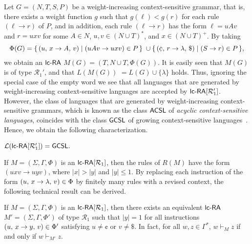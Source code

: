 Let $G=(N,T,S,P)$ be a weight-increasing context-sensitive grammar, that is, there exists a weight function $g$ such that $g(\ell) < g(r)$ for each rule $(\ell\to r)$ of $P$, and in addition, each rule $(\ell\to r)$ has the form $\ell=uAv$ and $r=uxv$ for some $A\in N$, $u,v\in(N\cup T)^*$, and $x\in (N\cup T)^+$. By taking
$$\Phi(G)  =  \{\,\rarule{u}{x}{A}{v} \mid (uAv\to uxv)\in P\,\}\; \cup
              \{\,\rarule{\cent}{r}{\lambda}{\$} \mid (S\to r)\in P\,\},$$
we obtain an $\lcRA$ $M(G) = (T,N\cup T,\Phi(G))$. It is easily seen that $M(G)$ is of type $\mathcal{R}_1'$, and that $L(M(G))$ $ = L(G)\cup\{\lambda\}$ holds. Thus, ignoring the special case of the empty word we see that all languages that are generated by weight-increasing context-sensitive languages are accepted by $\lcRAp[1]$. However, the class of languages that are generated by weight-increasing context-sensitive grammars, which is known as the class \index{$\ACSL$}$\ACSL$ of \emph{acyclic context-sensitive languages}, coincides with the class $\textup{\sf GCSL}$ of growing context-sensitive languages~\cite{NiWo01}. Hence, we obtain the following characterization.

\begin{theorem}\label{PropR1a}
${\mathcal L}(\lcRAp[1]) =  \GCSL.$
\end{theorem}

If $M = (\Sigma,\Gamma,\Phi)$ is an $\lcRA[1]$, then the rules of $R(M)$ have the form $(uxv \to uyv)$, where $|x|>|y|$ and $|y|\le 1$. By replacing each instruction of the form $(u,\,x\rightarrow\lambda,\,v)\in \Phi$ by finitely many rules with a revised context, the following technical result can be derived.

\begin{lemma}\label{LemR1a}
If $M = (\Sigma,\Gamma,\Phi)$ is an $\lcRA[1]$, then there exists an equivalent $\lcRA$ $M'=(\Sigma,\Gamma,\Phi')$ of type $\mathcal{R}_1$ such that $|y|=1$ for all instructions $(u,\,x\rightarrow y,\,v)\in \Phi'$ satisfying $u\not=\cent$ or $v\not=\$$. In fact, for all $w,z\in \Gamma^*$, $w\vdash_M z$ if and only if $w\vdash_{M'} z$.
\end{lemma}

